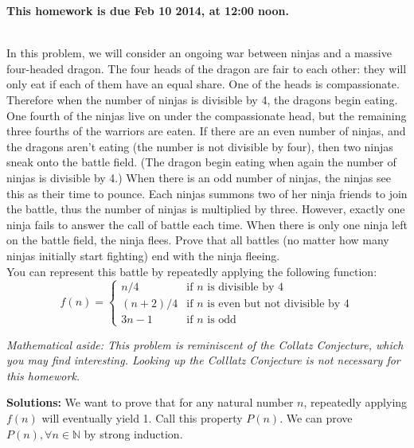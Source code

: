 \documentclass[11pt]{article}
\newif\ifsolutions
\renewcommand{\answer}[1]{{\color{mydarkblue}\textbf{}#1}}
\begin{document}
\maketitle

\vspace{0.5em}
{\Large{\textbf{This homework is due Feb 10 2014, at 12:00 noon.}}}


\begin{qunlist}

 \\ 
In this problem, we will consider an ongoing war between ninjas and a massive four-headed dragon. 
The four heads of the dragon are fair to each other: 
they will only eat if each of them have an equal share. One of the heads is compassionate. 
Therefore when the number of ninjas is divisible by 4, the dragons begin eating.  
One fourth of the ninjas live on under the compassionate head, 
but the remaining three fourths of the warriors are eaten. 
If there are an even number of ninjas, and the dragons aren't eating 
(the number is not divisible by four), then two ninjas sneak onto the battle field. 
(The dragon begin eating when again the number of ninjas is divisible by 4.)
When there is an odd number of ninjas, the ninjas see this as their time to pounce. 
Each ninjas summons two of her ninja friends to join the battle, 
thus the number of ninjas is multiplied by three. 
However, exactly one ninja fails to answer the call of battle each time. 
When there is only one ninja left on the battle field, the ninja flees. 
Prove that all battles (no matter how many ninjas initially start fighting) 
end with the ninja fleeing. \\
You can represent this battle by repeatedly applying the following function:
\[ f(n) = \left\{ 
    \begin{array}{cl} 
        n/4 & \text{if $n$ is divisible by 4} \\
        (n+2)/4 & \text{if $n$ is even but not divisible by 4} \\
        3n - 1 & \text{if $n$ is odd} 
    \end{array} 
\right. \]

\textit{Mathematical aside: This problem is reminiscent of the Collatz Conjecture, which you may find interesting. Looking up the Colllatz Conjecture is not necessary for this homework.}

\ifsolutions
\answer{
\textbf{Solutions:}
We want to prove that for any natural number $n$, repeatedly applying $f(n)$ will eventually yield 1. Call this property $P(n)$. We can prove $P(n), \forall n \in \mathbb{N}$ by strong induction.

}
\end{qunlist}
\end{document}
